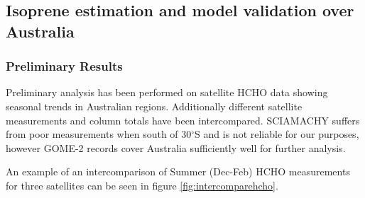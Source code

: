 \subsection{Isoprene estimation and model validation over Australia}

\subsubsection{Preliminary Results}

Preliminary analysis has been performed on satellite HCHO data showing seasonal trends in Australian regions.
Additionally different satellite measurements and column totals have been intercompared.
SCIAMACHY suffers from poor measurements when south of 30$^{\circ}$S and is not reliable for our purposes, however GOME-2 records cover Australia sufficiently well for further analysis. 

An example of an intercomparison of Summer (Dec-Feb) HCHO measurements for three satellites can be seen in figure \ref{fig:intercomparehcho}.